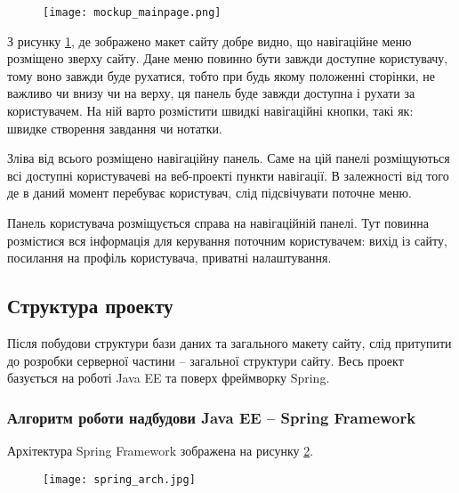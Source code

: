 \begin{figure}[!ht]
\centering
		\texttt{[image: mockup\_mainpage.png]}
		\label{pic:mockup}
\end{figure}

\par З рисунку \ref{pic:mockup}, де зображено макет сайту добре видно, що навігаційне меню розміщено зверху сайту. Дане меню повинно бути завжди доступне користувачу, тому воно завжди буде рухатися, тобто при будь якому положенні сторінки, не важливо чи внизу чи на верху, ця панель буде завжди доступна і рухати за користувачем. На ній варто розмістити швидкі навігаційні кнопки, такі як: швидке створення завдання чи нотатки.
\par Зліва від всього розміщено навігаційну панель. Саме на цій панелі розміщуються всі доступні  користувачеві на веб-проекті пункти навігації. В залежності від того де в даний момент перебуває користувач, слід підсвічувати поточне меню.
\par Панель користувача розміщується справа на навігаційній панелі. Тут повинна розмістися вся інформація для керування поточним користувачем: вихід із сайту, посилання на профіль користувача, приватні налаштування.

\subsection{Структура проекту}
\par Після побудови структури бази даних та загального макету сайту, слід притупити до розробки серверної частини -- загальної структури сайту. Весь проект базується на роботі Java EE та поверх фреймворку Spring.

\subsubsection{Алгоритм роботи надбудови Java EE -- Spring Framework}
Архітектура Spring Framework зображена на рисунку \ref{pic:spring_arch}.

	\begin{figure}[!ht]
	\centering
			\texttt{[image: spring\_arch.jpg]}
			\label{pic:spring_arch}
	\end{figure}

